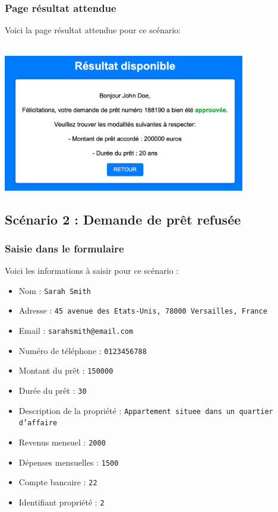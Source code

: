 \documentclass{article}
\begin{document}
    \subsubsection{Page résultat attendue}
    Voici la page résultat attendue pour ce scénario: \\
    \\
    \begin{center}
    \includegraphics[width=300pt]{Images/9.1/reponsePositive.png}\\
    \end{center}

    \subsection{Scénario 2 : Demande de prêt refusée}
    \subsubsection{Saisie dans le formulaire}
    Voici les informations à saisir pour ce scénario :
    \begin{itemize}
        \item Nom : \texttt{Sarah Smith}
        \item Adresse : \texttt{45 avenue des Etats-Unis, 78000 Versailles, France}
        \item Email : \texttt{sarahsmith@email.com}
        \item Numéro de téléphone : \texttt{0123456788}
        \item Montant du prêt : \texttt{150000}
        \item Durée du prêt : \texttt{30}
        \item Description de la propriété : \texttt{Appartement situee dans un quartier d'affaire} 
        \item Revenus mensuel : \texttt{2000}  
        \item Dépenses mensuelles : \texttt{1500}  
        \item Compte bancaire : \texttt{22}  
        \item Identifiant propriété : \texttt{2}
    \end{itemize}
    
\end{document}
